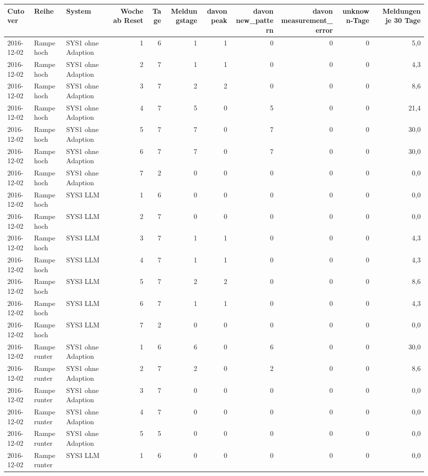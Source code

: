 \begin{tabular}{lllrrrrrrrr}
\toprule
Cutover & Reihe & System & Woche ab Reset & Tage & Meldungstage & davon peak & davon new\_pattern & davon measurement\_error & unknown-Tage & Meldungen je 30 Tage \\
\midrule
2016-12-02 & Rampe hoch & SYS1 ohne Adaption & 1 & 6 & 1 & 1 & 0 & 0 & 0 & 5,0 \\
2016-12-02 & Rampe hoch & SYS1 ohne Adaption & 2 & 7 & 1 & 1 & 0 & 0 & 0 & 4,3 \\
2016-12-02 & Rampe hoch & SYS1 ohne Adaption & 3 & 7 & 2 & 2 & 0 & 0 & 0 & 8,6 \\
2016-12-02 & Rampe hoch & SYS1 ohne Adaption & 4 & 7 & 5 & 0 & 5 & 0 & 0 & 21,4 \\
2016-12-02 & Rampe hoch & SYS1 ohne Adaption & 5 & 7 & 7 & 0 & 7 & 0 & 0 & 30,0 \\
2016-12-02 & Rampe hoch & SYS1 ohne Adaption & 6 & 7 & 7 & 0 & 7 & 0 & 0 & 30,0 \\
2016-12-02 & Rampe hoch & SYS1 ohne Adaption & 7 & 2 & 0 & 0 & 0 & 0 & 0 & 0,0 \\
2016-12-02 & Rampe hoch & SYS3 LLM & 1 & 6 & 0 & 0 & 0 & 0 & 0 & 0,0 \\
2016-12-02 & Rampe hoch & SYS3 LLM & 2 & 7 & 0 & 0 & 0 & 0 & 0 & 0,0 \\
2016-12-02 & Rampe hoch & SYS3 LLM & 3 & 7 & 1 & 1 & 0 & 0 & 0 & 4,3 \\
2016-12-02 & Rampe hoch & SYS3 LLM & 4 & 7 & 1 & 1 & 0 & 0 & 0 & 4,3 \\
2016-12-02 & Rampe hoch & SYS3 LLM & 5 & 7 & 2 & 2 & 0 & 0 & 0 & 8,6 \\
2016-12-02 & Rampe hoch & SYS3 LLM & 6 & 7 & 1 & 1 & 0 & 0 & 0 & 4,3 \\
2016-12-02 & Rampe hoch & SYS3 LLM & 7 & 2 & 0 & 0 & 0 & 0 & 0 & 0,0 \\
2016-12-02 & Rampe runter & SYS1 ohne Adaption & 1 & 6 & 6 & 0 & 6 & 0 & 0 & 30,0 \\
2016-12-02 & Rampe runter & SYS1 ohne Adaption & 2 & 7 & 2 & 0 & 2 & 0 & 0 & 8,6 \\
2016-12-02 & Rampe runter & SYS1 ohne Adaption & 3 & 7 & 0 & 0 & 0 & 0 & 0 & 0,0 \\
2016-12-02 & Rampe runter & SYS1 ohne Adaption & 4 & 7 & 0 & 0 & 0 & 0 & 0 & 0,0 \\
2016-12-02 & Rampe runter & SYS1 ohne Adaption & 5 & 5 & 0 & 0 & 0 & 0 & 0 & 0,0 \\
2016-12-02 & Rampe runter & SYS3 LLM & 1 & 6 & 0 & 0 & 0 & 0 & 0 & 0,0 \\

\end{tabular}
